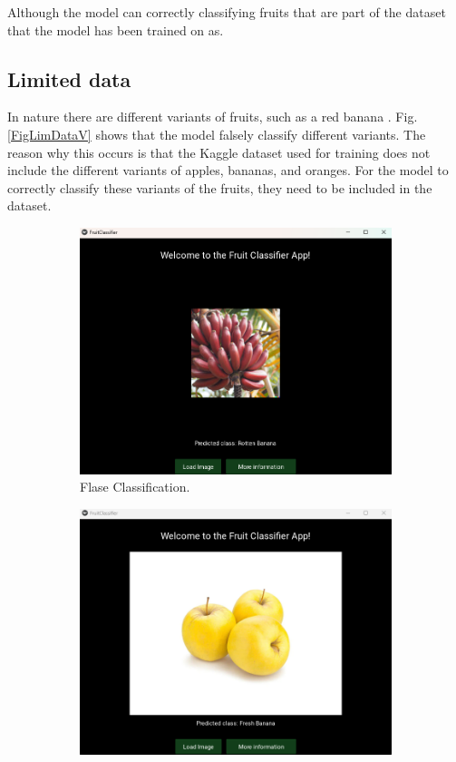 \documentclass[conference]{IEEEtran}
\begin{document}
Although the model can correctly classifying fruits that are part of the dataset that the model has been trained on as.

\subsection{Limited data}

In nature there are different variants of fruits, such as a red banana \cite{b18}. Fig. \ref{FigLimDataV} shows that the model falsely classify different variants. The reason why this occurs is that the Kaggle dataset used for training does not include the different variants of apples, bananas, and oranges. For the model to correctly classify these variants of the fruits, they need to be included in the dataset.

\begin{figure}[h]
    \centering
    \begin{subfigure}[b]{0.48\linewidth}
        \centering
        \includegraphics[width=\linewidth]{Red Banana not seen as banana.png}
        \caption{Flase Classification.}
        \label{figFA}
    \end{subfigure}
    \hfill
    \begin{subfigure}[b]{0.48\linewidth}
        \centering
        \includegraphics[width=\linewidth]{Yellow Apples not seen as apples.png}

\end{subfigure}
\end{figure}
\end{document}
